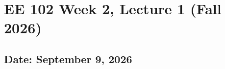 \documentclass{ee102_notes}
\renewcommand{\releasedate}{September 9, 2026}
\begin{document}
\section*{EE 102 Week 2, Lecture 1 (Fall 2026)}
\subsection*{Date: \releasedate}
\tableofcontents

\end{document}
